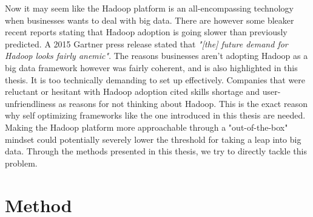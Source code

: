 \documentclass[a4paper,english]{report}
\begin{document}
		Now it may seem like the Hadoop platform is an all-encompassing 
		technology when businesses wants to deal with big data. There are however some bleaker recent reports stating that Hadoop adoption is going slower than previously predicted. A 2015 Gartner press release stated that \textit{"[the] future demand for Hadoop looks fairly anemic"}\cite{Gartner}. The reasons businesses aren't adopting Hadoop as a big data framework however was fairly coherent, and is also highlighted in this thesis. It is too technically demanding to set up effectively. Companies that were reluctant or hesitant with Hadoop adoption cited skills shortage and user-unfriendliness as reasons for not thinking about Hadoop\cite{Gartner}. This is the exact reason why self optimizing frameworks like the one introduced in this thesis are needed. Making the Hadoop platform more approachable through a "out-of-the-box" mindset could potentially severely lower the threshold for taking a leap into big data. Through the methods presented in this thesis, we try to directly tackle this problem.
	
	\chapter{Method}
		
\end{document}
